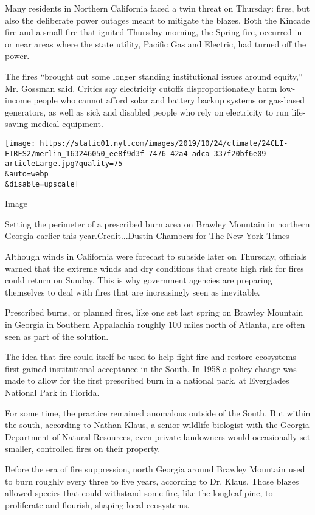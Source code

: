 Many residents in Northern California faced a twin threat on Thursday:
fires, but also the deliberate power outages meant to mitigate the
blazes. Both the Kincade fire and a small fire that ignited Thursday
morning, the Spring fire, occurred in or near areas where the state
utility, Pacific Gas and Electric, had turned off the power.

The fires ``brought out some longer standing institutional issues around
equity,'' Mr. Gossman said. Critics say electricity cutoffs
disproportionately harm low-income people who cannot afford solar and
battery backup systems or gas-based generators, as well as sick and
disabled people who rely on electricity to run life-saving medical
equipment.

\texttt{[image: https://static01.nyt.com/images/2019/10/24/climate/24CLI-FIRES2/merlin\_163246050\_ee8f9d3f-7476-42a4-adca-337f20bf6e09-articleLarge.jpg?quality=75\\\&auto=webp\\\&disable=upscale]}

Image

Setting the perimeter of a prescribed burn area on Brawley Mountain in
northern Georgia earlier this year.Credit...Dustin Chambers for The New
York Times

Although winds in California were forecast to subside later on Thursday,
officials warned that the extreme winds and dry conditions that create
high risk for fires could return on Sunday. This is why government
agencies are preparing themselves to deal with fires that are
increasingly seen as inevitable.

Prescribed burns, or planned fires, like one set last spring on Brawley
Mountain in Georgia in Southern Appalachia roughly 100 miles north of
Atlanta, are often seen as part of the solution.

The idea that fire could itself be used to help fight fire and restore
ecosystems first gained institutional acceptance in the South. In 1958 a
policy change was made to allow for the first prescribed burn in a
national park, at Everglades National Park in Florida.

For some time, the practice remained anomalous outside of the South. But
within the south, according to Nathan Klaus, a senior wildlife biologist
with the Georgia Department of Natural Resources, even private
landowners would occasionally set smaller, controlled fires on their
property.

Before the era of fire suppression, north Georgia around Brawley
Mountain used to burn roughly every three to five years, according to
Dr. Klaus. Those blazes allowed species that could withstand some fire,
like the longleaf pine, to proliferate and flourish, shaping local
ecosystems.

